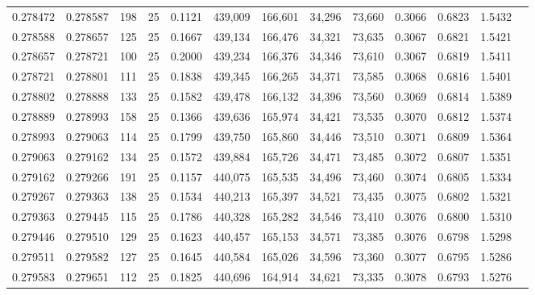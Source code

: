 \begin{tabular}{rrrrrrrrrrrrr}
0.278472 & 0.278587 &   198 &  25 &                                     0.1121 & 439,009 & 166,601 &  34,296 &  73,660 & 0.3066 & 0.6823 & 1.5432 \\
0.278588 & 0.278657 &   125 &  25 &                                     0.1667 & 439,134 & 166,476 &  34,321 &  73,635 & 0.3067 & 0.6821 & 1.5421 \\
0.278657 & 0.278721 &   100 &  25 &                                     0.2000 & 439,234 & 166,376 &  34,346 &  73,610 & 0.3067 & 0.6819 & 1.5411 \\
0.278721 & 0.278801 &   111 &  25 &                                     0.1838 & 439,345 & 166,265 &  34,371 &  73,585 & 0.3068 & 0.6816 & 1.5401 \\
0.278802 & 0.278888 &   133 &  25 &                                     0.1582 & 439,478 & 166,132 &  34,396 &  73,560 & 0.3069 & 0.6814 & 1.5389 \\
0.278889 & 0.278993 &   158 &  25 &                                     0.1366 & 439,636 & 165,974 &  34,421 &  73,535 & 0.3070 & 0.6812 & 1.5374 \\
0.278993 & 0.279063 &   114 &  25 &                                     0.1799 & 439,750 & 165,860 &  34,446 &  73,510 & 0.3071 & 0.6809 & 1.5364 \\
0.279063 & 0.279162 &   134 &  25 &                                     0.1572 & 439,884 & 165,726 &  34,471 &  73,485 & 0.3072 & 0.6807 & 1.5351 \\
0.279162 & 0.279266 &   191 &  25 &                                     0.1157 & 440,075 & 165,535 &  34,496 &  73,460 & 0.3074 & 0.6805 & 1.5334 \\
0.279267 & 0.279363 &   138 &  25 &                                     0.1534 & 440,213 & 165,397 &  34,521 &  73,435 & 0.3075 & 0.6802 & 1.5321 \\
0.279363 & 0.279445 &   115 &  25 &                                     0.1786 & 440,328 & 165,282 &  34,546 &  73,410 & 0.3076 & 0.6800 & 1.5310 \\
0.279446 & 0.279510 &   129 &  25 &                                     0.1623 & 440,457 & 165,153 &  34,571 &  73,385 & 0.3076 & 0.6798 & 1.5298 \\
0.279511 & 0.279582 &   127 &  25 &                                     0.1645 & 440,584 & 165,026 &  34,596 &  73,360 & 0.3077 & 0.6795 & 1.5286 \\
0.279583 & 0.279651 &   112 &  25 &                                     0.1825 & 440,696 & 164,914 &  34,621 &  73,335 & 0.3078 & 0.6793 & 1.5276 \\

\end{tabular}
